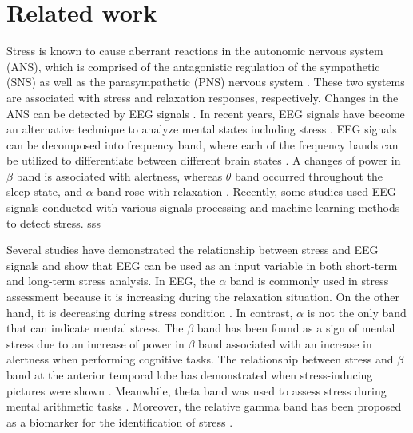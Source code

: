 \documentclass[pdflatex,sn-mathphys]{sn-jnl}%
\theoremstyle{thmstyleone}%
\theoremstyle{thmstyletwo}%
\theoremstyle{thmstylethree}%
\begin{document}

\section{Related work} \label{sec2}
Stress is known to cause aberrant reactions in the autonomic nervous system (ANS), which is comprised of the antagonistic regulation of the sympathetic (SNS) as well as the parasympathetic (PNS) nervous system \cite{Cohen2000, Hughes2000}. These two systems are associated with stress and relaxation responses, respectively. Changes in the ANS can be detected by EEG signals \cite{Seo2010}. In recent years, EEG signals have become an alternative technique to analyze mental states including stress \cite{Awang2011, Hu2015}. EEG signals can be decomposed into frequency band\cite{Kulkarni2020}, where each of the frequency bands can be utilized to differentiate between different brain states \cite{Alshargie-2018}. A changes of power in $\beta$ band is associated with alertness, whereas $\theta$ band occurred throughout the sleep state, and $\alpha$ band rose with relaxation \cite{Wang2014}. Recently, some studies used EEG signals conducted with various signals processing and machine learning methods to detect stress. sss

Several studies have demonstrated the relationship between stress and EEG signals and show that EEG can be used as an input variable in both short-term and long-term stress analysis. In EEG, the $\alpha$ band is commonly used in stress assessment because it is increasing during the relaxation situation. On the other hand, it is decreasing during stress condition \cite{Alshargie-2016}. In contrast, $\alpha$ is not the only band that can indicate mental stress. The $\beta$ band has been found as a sign of mental stress due to an increase of power in $\beta$ band associated with an increase in alertness when performing cognitive tasks. The relationship between stress and $\beta$ band at the anterior temporal lobe has demonstrated when stress-inducing pictures were shown \cite{Seo2010, Awang2011, Hamid2010}. Meanwhile, theta band was used to assess stress during mental arithmetic tasks \cite{Grtner2015}. Moreover, the relative gamma band has been proposed as a biomarker for the identification of stress \cite{Arsalan2019}.
\end{document}
